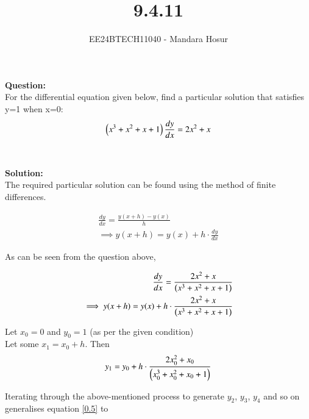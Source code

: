 \documentclass[journal]{IEEEtran}
\begin{document}

\vspace{3cm}

\title{9.4.11}
\author{EE24BTECH11040 - Mandara Hosur}
{\let\newpage\relax\maketitle}

\renewcommand{\thefigure}{\theenumi}
\renewcommand{\thetable}{\theenumi}
\setlength{\intextsep}{10pt} %


\renewcommand{\thetable}{\theenumi}

\textbf{Question:}\\
For the differential equation given below, find a particular solution that satisfies y=1 when x=0:
\begin{align}
	\left(x^3 + x^2 + x + 1\right)\frac{dy}{dx} = 2x^2 + x
\end{align}
\\ \\
\textbf{Solution:} \\
The required particular solution can be found using the method of finite differences. 

\begin{align}
\frac{dy}{dx} = \frac{y(x+h) - y(x)}{h} \\
\implies y(x+h) = y(x) + h\cdot\frac{dy}{dx}
\end{align}

As can be seen from the question above,

\begin{align}
\frac{dy}{dx} = \frac{2x^2 + x}{\left(x^3 + x^2 + x + 1\right)} \\
\implies y(x+h) = y(x) + h\cdot\frac{2x^2 + x}{\left(x^3 + x^2 + x + 1\right)}
\end{align}

Let $x_0 = 0$ and $y_0 = 1$ (as per the given condition) \\
Let some $x_1 = x_0 + h$. Then
\begin{align}
y_1 = y_0 + h\cdot\frac{2x_0^2 + x_0}{\left(x_0^3 + x_0^2 + x_0 + 1\right)}
\label{0.5}
\end{align}

Iterating through the above-mentioned process to generate $y_2$, $y_3$, $y_4$ and so on generalises equation \eqref{0.5} to
\end{document}

